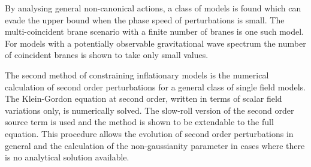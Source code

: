 % 
By analysing general non-canonical actions, a class of models is found which can
evade the upper bound when the phase speed of perturbations is small. The multi-coincident brane
scenario with a finite number of branes is one such model. 
For models with a potentially observable gravitational wave spectrum the number of coincident branes
is shown to take only small values. 

The second method of constraining inflationary models is the numerical calculation
of second order perturbations for a general class of single field models.
The Klein-Gordon equation at second order, written in terms
of scalar field variations only, is numerically solved. 
The slow-roll version of the second order source term is used and the method is
shown to be extendable to the full equation.
This procedure allows the evolution of second order
perturbations in general and the calculation of the non-gaussianity parameter in cases
where there is no analytical solution available.  


